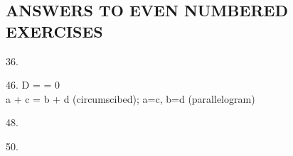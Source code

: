 \documentclass[11pt]{amsbook}
\begin{document}
    \begin{center}
        \section*{ANSWERS TO EVEN NUMBERED EXERCISES} 
    \end{center}
    
    \begin{hEnumerateArabic}
        \item[36.] 
        \item[46.]
            D =   = 0\\
            a + c = b + d   (circumscibed);   a=c, b=d (parallelogram)
        \item[48.]
        \item[50.]
    \end{hEnumerateArabic}

\end{document}
